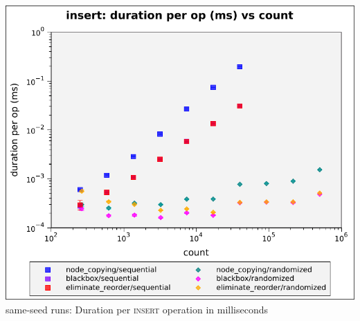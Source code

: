 \documentclass{beamer}
\begin{document}
\begin{frame}
\begin{multicols}{2}
      \includegraphics[height=0.55\textheight]{figures/graphs/insert-duration-per-op-vs-count.pdf}
       same-seed runs: Duration per \textsc{insert} operation in milliseconds\vphantom{ --- only head node}
      \newline \phantom{ --- only head node}
\end{multicols}
\end{frame}
\end{document}
